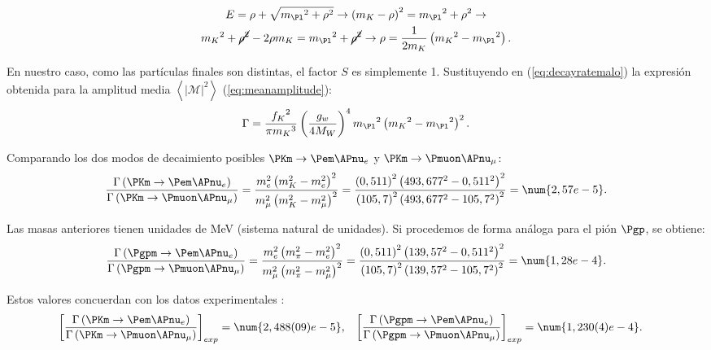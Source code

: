 \begin{multline}
E=\rho+\sqrt{{m_{\Pl}}^{2}+\rho^{2}} \rightarrow \left(m_{K}-\rho\right)^{2}= {m_{\Pl}}^{2}+\rho^{2} \rightarrow \\ {m_{K}}^{2}+\cancel{\rho^{2}}-2\rho m_{K}={m_{\Pl}}^{2}+\cancel{\rho^{2}} \rightarrow \rho = \dfrac{1}{2 m_K}\left({m_{K}}^{2}-{m_{\Pl}}^{2}\right) .
\end{multline}

En nuestro caso, como las partículas finales son distintas, el factor $S$ es simplemente 1. Sustituyendo en (\ref{eq:decayratemalo}) la expresión obtenida para la amplitud media $\left\langle |\mathcal{M}|^{2}\right\rangle$ (\ref{eq:meanamplitude}):
\begin{equation}
\Gamma =\dfrac{{f_{K}}^{2}}{\pi {m_{K}}^{3}}\left( \dfrac{g_w}{4M_W}\right)^{4}{m_{\Pl}}^{2}\left({m_{K}}^{2}-{m_{\Pl}}^{2}\right)^{2} .\label{eq:decayratebueno}
\end{equation}

Comparando los dos modos de decaimiento posibles $\PKm \rightarrow \Pem \APnu_{e}$ y $\PKm \rightarrow \Pmuon \APnu_{\mu}$:
\begin{equation}
\dfrac{\Gamma \left( \PKm \rightarrow \Pem \APnu_{e}\right) }{\Gamma \left( \PKm \rightarrow \Pmuon \APnu_{\mu}\right) }=\dfrac{m_{e}^{2}\left( m_{K}^{2}-m_{e}^{2}\right) ^{2}}{m_{\mu }^{2}\left( m_{K}^{2}-m_{\mu }^{2}\right) ^{2}}=\dfrac{\left( 0,511\right) ^{2}\left( 493,677^{2}-0,511^{2}\right) ^{2}}{\left( 105,7\right) ^{2}\left( 493,677^{2}-105,7^{2}\right) ^{2}}=\num{2,57e-5}.\label{eq:BRkaon}
\end{equation}

Las masas anteriores tienen unidades de MeV (sistema natural de unidades). Si procedemos de forma análoga para el pión $\Pgp$, se obtiene:
\begin{equation}
\dfrac{\Gamma \left( \Pgpm \rightarrow \Pem \APnu_{e}\right) }{\Gamma \left( \Pgpm \rightarrow \Pmuon \APnu_{\mu}\right) }=\dfrac{m_{e}^{2}\left( m_{\pi}^{2}-m_{e}^{2}\right) ^{2}}{m_{\mu }^{2}\left( m_{\pi}^{2}-m_{\mu }^{2}\right) ^{2}}=\dfrac{\left( 0,511\right) ^{2}\left(139,57^{2}-0,511^{2}\right) ^{2}}{\left( 105,7\right) ^{2}\left( 139,57^{2}-105,7^{2}\right) ^{2}}=\num{1,28e-4}.\label{eq:BRpion}
\end{equation}

Estos valores concuerdan con los datos experimentales \cite{tanabashi} \cite{olive}:
\begin{align}
\left[\dfrac{\Gamma \left( \PKm \rightarrow \Pem \APnu_{e}\right)}{\Gamma \left( \PKm \rightarrow \Pmuon \APnu_{\mu}\right)}\right]_{exp} &= \num{2,488(09)e-5}, & \left[\dfrac{\Gamma \left( \Pgpm \rightarrow \Pem \APnu_{e}\right)}{\Gamma \left( \Pgpm \rightarrow \Pmuon \APnu_{\mu}\right)}\right]_{exp} &= \num{1,230(4)e-4}.\label{eq:BRexp}
\end{align}

